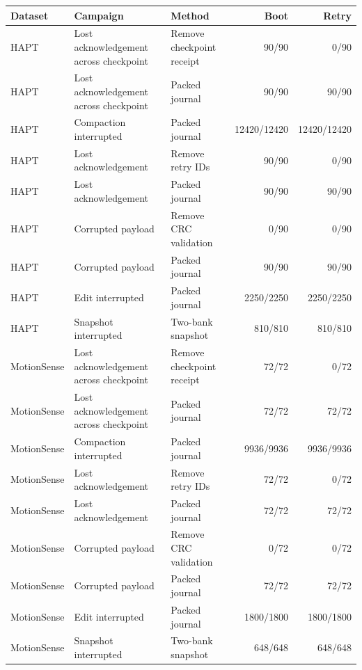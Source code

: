 \begin{tabular}{lllrr}
\toprule
Dataset & Campaign & Method & Boot & Retry \\
\midrule
HAPT & Lost acknowledgement across checkpoint & Remove checkpoint receipt & 90/90 & 0/90 \\
HAPT & Lost acknowledgement across checkpoint & Packed journal & 90/90 & 90/90 \\
HAPT & Compaction interrupted & Packed journal & 12420/12420 & 12420/12420 \\
HAPT & Lost acknowledgement & Remove retry IDs & 90/90 & 0/90 \\
HAPT & Lost acknowledgement & Packed journal & 90/90 & 90/90 \\
HAPT & Corrupted payload & Remove CRC validation & 0/90 & 0/90 \\
HAPT & Corrupted payload & Packed journal & 90/90 & 90/90 \\
HAPT & Edit interrupted & Packed journal & 2250/2250 & 2250/2250 \\
HAPT & Snapshot interrupted & Two-bank snapshot & 810/810 & 810/810 \\
MotionSense & Lost acknowledgement across checkpoint & Remove checkpoint receipt & 72/72 & 0/72 \\
MotionSense & Lost acknowledgement across checkpoint & Packed journal & 72/72 & 72/72 \\
MotionSense & Compaction interrupted & Packed journal & 9936/9936 & 9936/9936 \\
MotionSense & Lost acknowledgement & Remove retry IDs & 72/72 & 0/72 \\
MotionSense & Lost acknowledgement & Packed journal & 72/72 & 72/72 \\
MotionSense & Corrupted payload & Remove CRC validation & 0/72 & 0/72 \\
MotionSense & Corrupted payload & Packed journal & 72/72 & 72/72 \\
MotionSense & Edit interrupted & Packed journal & 1800/1800 & 1800/1800 \\
MotionSense & Snapshot interrupted & Two-bank snapshot & 648/648 & 648/648 \\
\bottomrule
\end{tabular}
